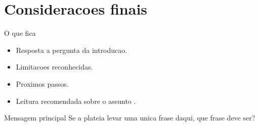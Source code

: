 \section{Consideracoes finais}

\begin{frame}{O que fica}
  \begin{itemize}
    \item Resposta a pergunta da introducao.
    \item Limitacoes reconhecidas.
    \item Proximos passos.
    \item Leitura recomendada sobre o assunto \cite{knuth1984}.
  \end{itemize}

  \vspace{1em}
  \begin{alertblock}{Mensagem principal}
    Se a plateia levar uma unica frase daqui, que frase deve ser?
  \end{alertblock}
\end{frame}
